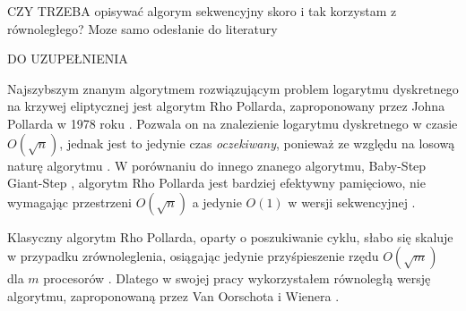 CZY TRZEBA opisywać algorym sekwencyjny skoro i tak korzystam z równoległego? Moze samo odesłanie do literatury
\par
DO UZUPEŁNIENIA
\par
\par
Najszybszym znanym algorytmem rozwiązującym problem logarytmu dyskretnego na krzywej eliptycznej
jest algorytm Rho Pollarda,
zaproponowany przez Johna Pollarda w 1978 roku \cite{Pollard1978}.
Pozwala on na znalezienie logarytmu dyskretnego w czasie $O(\sqrt{n})$,
jednak jest to jedynie czas \textit{oczekiwany}, ponieważ ze względu na losową naturę algorytmu \cite{Blake2005}.
W porównaniu do innego znanego algorytmu, Baby-Step Giant-Step \cite{Stinson2021}, algorytm Rho Pollarda jest bardziej
efektywny pamięciowo, nie wymagając
przestrzeni $O(\sqrt{n})$ a jedynie $O(1)$ w wersji sekwencyjnej \cite{Stinson2021}\cite{Blake2005}.
\par
Klasyczny algorytm Rho Pollarda, oparty o poszukiwanie cyklu, słabo się skaluje w przypadku zrównoleglenia,
osiągając jedynie przyśpieszenie rzędu $O(\sqrt{m})$ dla $m$ procesorów \cite{Goldberg}.
Dlatego w swojej pracy wykorzystałem równoległą wersję algorytmu, zaproponowaną przez Van Oorschota i Wienera \cite{Oorschot}.


